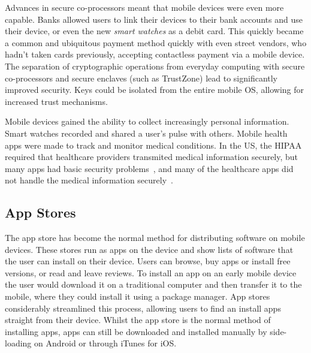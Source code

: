\documentclass[thesis.tex]{subfiles}
\begin{document}
Advances in secure co-processors meant that mobile devices were even
more capable.  Banks allowed users to link their devices to their bank
accounts and use their device, or even the new \emph{smart watches} as
a debit card.  This quickly became a common and ubiquitous payment
method quickly with even street vendors, who hadn't taken cards
previously, accepting contactless payment via a mobile device.  The
separation of cryptographic operations from everyday computing with
secure co-processors and secure enclaves (such as TrustZone) lead to
significantly improved security.  Keys could be isolated from the
entire mobile OS, allowing for increased trust mechanisms.

Mobile devices gained the ability to collect increasingly personal
information.  Smart watches recorded and shared a user's pulse with
others. Mobile health apps were made to track and monitor medical
conditions. In the US, the \ac{HIPAA} required that healthcare
providers transmited medical information securely, but many apps had
basic security problems~\cite{fahl_why_2012}, and many of the
healthcare apps did not handle the medical information
securely~\cite{knorr_privacy_2015}.

\subsection{App Stores}


The app store has become the normal method for distributing software
on mobile devices.  These stores run as apps on the device and show
lists of software that the user can install on their device.  Users
can browse, buy apps or install free versions, or read and leave
reviews.  To install an app on an early mobile device the user would
download it on a traditional computer and then transfer it to the
mobile, where they could install it using a package manager.  App
stores considerably streamlined this process, allowing users to find
an install apps straight from their device.  Whilst the app store is
the normal method of installing apps, apps can still be downloaded and
installed manually by side-loading on Android or through iTunes for
iOS.
\end{document}
